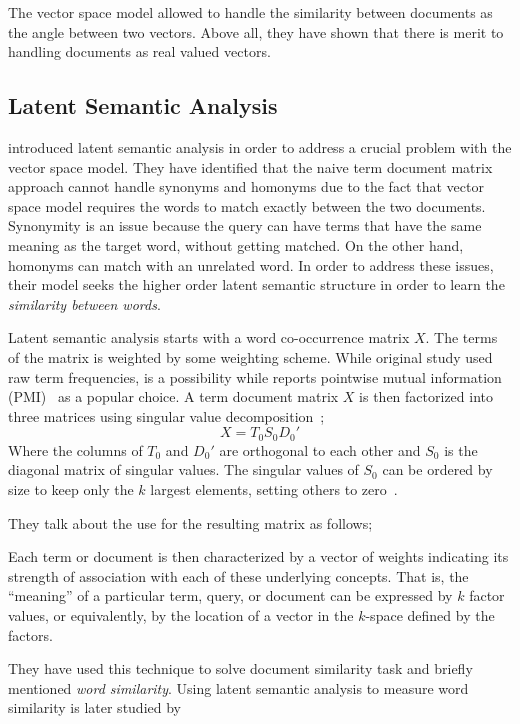 The vector space model allowed \citeauthor{salton_vector_1975} to handle the similarity between documents as the angle between two vectors.
Above all, they have shown that there is merit to handling documents as real valued vectors.

\subsection{Latent Semantic Analysis}%
\label{sub:latent_semantic_analysis}

\textcite{deerwester_indexing_1990} introduced latent semantic analysis in order to address a crucial problem with the vector space model.
They have identified that the naive term document matrix approach cannot handle synonyms and homonyms due to the fact that vector space model requires the words to match exactly between the two documents.
Synonymity is an issue because the query can have terms that have the same meaning as the target word, without getting matched.
On the other hand, homonyms can match with an unrelated word.
In order to address these issues, their model seeks the higher order latent semantic structure in order to learn the \emph{similarity between words}.

Latent semantic analysis starts with a word co-occurrence matrix $X$.
The terms of the matrix is weighted by some weighting scheme.
While original study used raw term frequencies, \tfidf{} is a possibility while \textcite{levy_improving_2015} reports pointwise mutual information (PMI)~\cite{church_word_1990} as a popular choice.
A term document matrix $X$ is then factorized into three matrices using singular value decomposition~\cite{forsythe_computer_1977};
\begin{displaymath}
    X = T_{0}S_{0}D_{0}'
\end{displaymath}
Where the columns of $T_{0}$ and $D_{0}'$ are orthogonal to each other and $S_{0}$ is the diagonal matrix of singular values.
The singular values of $S_{0}$ can be ordered by size to keep only the $k$ largest elements, setting others to zero~\cite{deerwester_indexing_1990}.

They talk about the use for the resulting matrix as follows;
\begin{displayquote}
    Each term or document is then characterized by a vector of weights indicating its strength of association with each of these underlying concepts.
    That is, the \enquote{meaning} of a particular term, query, or document can be expressed by $k$ factor values, or equivalently, by the location of a vector in the $k$-space defined by the factors.
\end{displayquote}
They have used this technique to solve document similarity task and briefly mentioned \emph{word similarity}.
Using latent semantic analysis to measure word similarity is later studied by \textcite{landauer_solution_1997}

